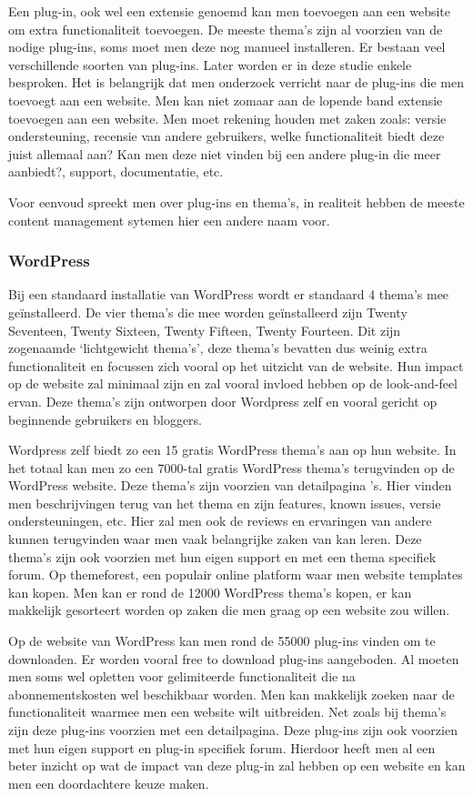 Een plug-in, ook wel een extensie genoemd kan men toevoegen aan een website om extra functionaliteit toevoegen. De meeste thema's zijn al voorzien van de nodige plug-ins, soms moet men deze nog manueel installeren. Er bestaan veel verschillende soorten van plug-ins. Later worden er in deze studie enkele besproken. Het is belangrijk dat men onderzoek verricht naar de plug-ins die men toevoegt aan een website. Men kan niet zomaar aan de lopende band extensie toevoegen aan een website. Men moet rekening houden met zaken zoals: versie ondersteuning, recensie van andere gebruikers, welke functionaliteit biedt deze juist allemaal aan? Kan men deze niet vinden bij een andere plug-in die meer aanbiedt?, support, documentatie, etc.

Voor eenvoud spreekt men over plug-ins en thema's, in realiteit hebben de meeste content management sytemen hier een andere naam voor.
\subsubsection{WordPress}
Bij een standaard installatie van WordPress wordt er standaard 4 thema's mee geïnstalleerd. De vier thema's die mee worden geïnstalleerd zijn Twenty Seventeen, Twenty Sixteen, Twenty Fifteen, Twenty Fourteen. Dit zijn zogenaamde `lichtgewicht thema's', deze thema's bevatten dus weinig extra functionaliteit en focussen zich vooral op het uitzicht van de website. Hun impact op de website zal minimaal zijn en zal vooral invloed hebben op de look-and-feel ervan. Deze thema's zijn ontworpen door Wordpress zelf en vooral gericht op beginnende gebruikers en bloggers.    

Wordpress zelf biedt zo een 15 gratis WordPress thema's aan op hun website. In het totaal kan men zo een 7000-tal gratis WordPress thema's terugvinden op de WordPress website. Deze thema's zijn voorzien van detailpagina 's. Hier vinden men beschrijvingen terug van het thema en zijn features, known issues, versie ondersteuningen, etc. Hier zal men ook de reviews en ervaringen van andere kunnen terugvinden waar men vaak belangrijke zaken van kan leren. Deze thema's zijn ook voorzien met hun eigen support en met een thema specifiek forum. Op themeforest, een populair online platform waar men website templates kan kopen. Men kan er rond de 12000 WordPress thema's kopen, er kan makkelijk gesorteert worden op zaken die men graag op een website zou willen.

Op de website van WordPress kan men rond de 55000 plug-ins vinden om te downloaden. Er worden vooral free to download plug-ins aangeboden. Al moeten men soms wel opletten voor gelimiteerde functionaliteit die na abonnementskosten wel beschikbaar worden. Men kan makkelijk zoeken naar de functionaliteit waarmee men een website wilt uitbreiden. Net zoals bij thema's zijn deze plug-ins voorzien met een detailpagina. Deze plug-ins zijn ook voorzien met hun eigen support en plug-in specifiek forum. Hierdoor heeft men al een beter inzicht op wat de impact van deze plug-in zal hebben op een website en kan men een doordachtere keuze maken.


